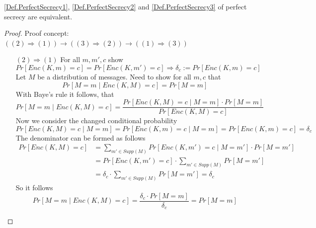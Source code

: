     	\begin{theorem}
    		\cref{Def.PerfectSecrecy1}, \cref{Def.PerfectSecrecy2} and \cref{Def.PerfectSecrecy3} of perfect secrecy are equivalent.
    	\end{theorem}
    	\begin{proof}
    		Proof concept: $((2) \Rightarrow (1)) \rightarrow ((3) \Rightarrow (2)) \rightarrow ((1) \Rightarrow (3))$
    		\begin{itemize}
    			\item[$(2) \Rightarrow (1)$] For all $m,m',c$ show
    					$$Pr[Enc(K,m)=c] = Pr[Enc(K,m')=c] \Rightarrow \delta_{c} := Pr[Enc(K,m)=c]$$
    				Let $M$ be a distribution of messages.
    				Need to show for all $m,c$ that
    					$$Pr[M=m \mid Enc(K,M)=c] = Pr[M=m]$$
    				With Baye's rule it follows, that
    					$$Pr[M=m \mid Enc(K,M)=c] = \frac{Pr[Enc(K,M)=c \mid M=m] \cdot Pr[M=m]}{Pr[Enc(K,M)=c]}$$
    				Now we consider the changed conditional probability
    					$$Pr[Enc(K,M)=c \mid M=m] = Pr[Enc(K,m)=c \mid M=m] = Pr[Enc(K,m)=c] = \delta_c$$
    				The denominator can be formed as follows
    				\begin{align*}
    					Pr[Enc(K,M)=c] &= \sum\limits_{m' \in Supp(M)} Pr[Enc(K,m')=c \mid M=m'] \cdot Pr[M=m']\\
    					&= Pr[Enc(K,m')=c] \cdot \sum\limits_{m' \in Supp(M)} Pr[M=m']\\
    					&= \delta_c \cdot \sum\limits_{m' \in Supp(M)} Pr[M=m'] = \delta_c
					\end{align*}
					So it follows 
					$$Pr[M=m \mid Enc(K,M)=c] = \frac{\delta_c \cdot Pr[M=m]}{\delta_c} = Pr[M=m]$$
					

\end{itemize}
\end{proof}
